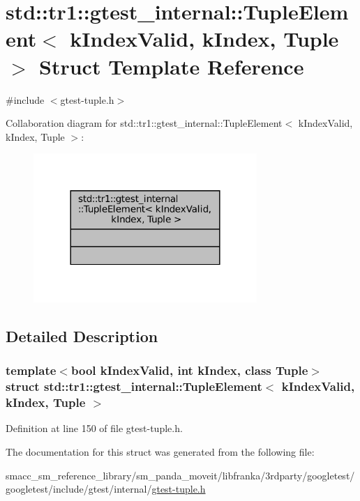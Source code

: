 \hypertarget{structstd_1_1tr1_1_1gtest__internal_1_1TupleElement}{}\section{std\+:\+:tr1\+:\+:gtest\+\_\+internal\+:\+:Tuple\+Element$<$ k\+Index\+Valid, k\+Index, Tuple $>$ Struct Template Reference}
\label{structstd_1_1tr1_1_1gtest__internal_1_1TupleElement}


{\ttfamily \#include $<$gtest-\/tuple.\+h$>$}



Collaboration diagram for std\+:\+:tr1\+:\+:gtest\+\_\+internal\+:\+:Tuple\+Element$<$ k\+Index\+Valid, k\+Index, Tuple $>$\+:
\nopagebreak
\begin{figure}[H]
\begin{center}
\leavevmode
\includegraphics[width=240pt]{structstd_1_1tr1_1_1gtest__internal_1_1TupleElement__coll__graph}
\end{center}
\end{figure}


\subsection{Detailed Description}
\subsubsection*{template$<$bool k\+Index\+Valid, int k\+Index, class Tuple$>$\newline
struct std\+::tr1\+::gtest\+\_\+internal\+::\+Tuple\+Element$<$ k\+Index\+Valid, k\+Index, Tuple $>$}



Definition at line 150 of file gtest-\/tuple.\+h.



The documentation for this struct was generated from the following file\+:\begin{DoxyCompactItemize}
\item 
smacc\+\_\+sm\+\_\+reference\+\_\+library/sm\+\_\+panda\+\_\+moveit/libfranka/3rdparty/googletest/googletest/include/gtest/internal/\hyperlink{gtest-tuple_8h}{gtest-\/tuple.\+h}\end{DoxyCompactItemize}
